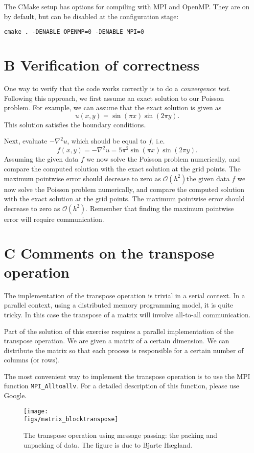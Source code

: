 \documentclass[onecolumn, oneside, a4paper, 11pt]{memoir}
\newcommand{\figs}{../figs}
\theoremstyle{remark}
\begin{document}
The CMake setup has options for compiling with MPI and OpenMP. They are on by
default, but can be disabled at the configuration stage:
\begin{lstlisting}
cmake . -DENABLE_OPENMP=0 -DENABLE_MPI=0
\end{lstlisting}

\section{B \quad Verification of correctness}

One way to verify that the code works correctly is to do a \emph{convergence
  test}. Following this approach, we first assume an exact solution to our
Poisson problem. For example, we can assume that the exact solution is given as
\[
  u(x,y) = \sin(\pi x) \sin(2\pi y).
\]
This solution satisfies the boundary conditions.

Next, evaluate $-\nabla^2 u$, which should be equal to $f$, i.e.
\[
  f(x,y) = -\nabla^2 u = 5\pi^2 \sin(\pi x) \sin(2\pi y).
\]
Assuming the given data $f$ we now solve the Poisson problem numerically, and
compare the computed solution with the exact solution at the grid points. The
maximum pointwise error should decrease to zero as $\mathcal{O}(h^2)$the given
data $f$ we now solve the Poisson problem numerically, and compare the computed
solution with the exact solution at the grid points. The maximum pointwise error
should decrease to zero as $\mathcal{O}(h^2)$. Remember that finding the maximum
pointwise error will require communication.

\section{C \quad Comments on the transpose operation}

The implementation of the transpose operation is trivial in a serial context. In
a parallel context, using a distributed memory programming model, it is quite
tricky. In this case the transpose of a matrix will involve all-to-all
communication.

Part of the solution of this exercise requires a parallel implementation of the
transpose operation. We are given a matrix of a certain dimension. We can
distribute the matrix so that each process is responsible for a certain number
of columns (or rows).

The most convenient way to implement the transpose operation is to use the MPI
function \texttt{MPI\_Alltoallv}. For a detailed description of this function,
please use Google.

\begin{figure}[htbp]
  \begin{center}
    \texttt{[image: \\figs/matrix\_blocktranspose]}
  \end{center}
  \caption{
    The transpose operation using message passing:
    the packing and unpacking of data.
    The figure is due to Bjarte H{\ae}gland.
  }
  \label{}
\end{figure}
\end{document}
